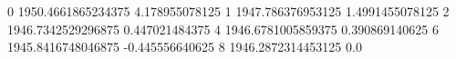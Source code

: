 0 1950.4661865234375 4.178955078125
1 1947.786376953125 1.4991455078125
2 1946.7342529296875 0.447021484375
4 1946.6781005859375 0.390869140625
6 1945.8416748046875 -0.445556640625
8 1946.2872314453125 0.0
